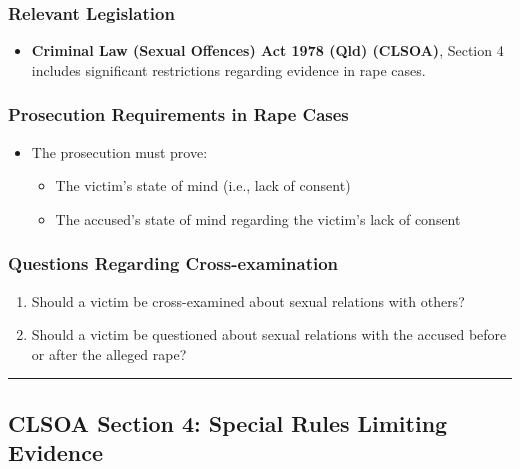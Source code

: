 \subsubsection{Relevant Legislation}\label{relevant-legislation}

\begin{itemize}
\tightlist
\item
  \textbf{Criminal Law (Sexual Offences) Act 1978 (Qld) (CLSOA)},
  Section 4 includes significant restrictions regarding evidence in rape
  cases.
\end{itemize}

\subsubsection{Prosecution Requirements in Rape
Cases}\label{prosecution-requirements-in-rape-cases}

\begin{itemize}
\tightlist
\item
  The prosecution must prove:

  \begin{itemize}
  \tightlist
  \item
    The victim's state of mind (i.e., lack of consent)
  \item
    The accused's state of mind regarding the victim's lack of consent
  \end{itemize}
\end{itemize}

\subsubsection{Questions Regarding
Cross-examination}\label{questions-regarding-cross-examination}

\begin{enumerate}
\def\labelenumi{\arabic{enumi}.}
\tightlist
\item
  Should a victim be cross-examined about sexual relations with others?
\item
  Should a victim be questioned about sexual relations with the accused
  before or after the alleged rape?
\end{enumerate}

\begin{center}\rule{0.5\linewidth}{0.5pt}\end{center}

\subsection{  CLSOA Section 4: Special Rules Limiting
Evidence}\label{clsoa-section-4-special-rules-limiting-evidence}

